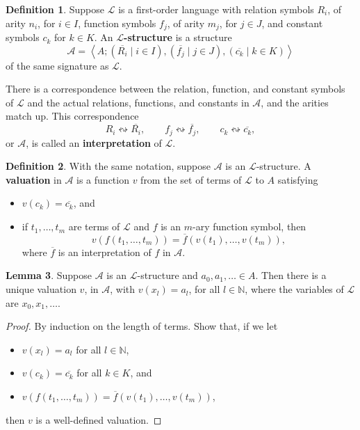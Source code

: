 \documentclass{article}
\newcommand{\N}{\mathbb{N}}
\newcommand{\A}{\mathcal{A}}
\renewcommand{\L}{\mathcal{L}}
\newcommand{\rb}[1]{\left( #1 \right)}
\newcommand{\ab}[1]{\left\langle #1 \right\rangle}
\theoremstyle{definition}\newtheorem{definition}{Definition}[subsection]
\theoremstyle{definition}\newtheorem{remark1}[definition]{Remark}
\theoremstyle{definition}\newtheorem{example1}[definition]{Example}
\theoremstyle{definition}\newtheorem*{remark2}{Remark}
\theoremstyle{definition}\newtheorem*{example2}{Example}
\theoremstyle{definition}\newtheorem*{note}{Note}
\theoremstyle{definition}\newtheorem*{notation}{Notation}
\newtheorem{lemma}[definition]{Lemma}
\begin{document}
\begin{definition}
Suppose $ \L $ is a first-order language with relation symbols $ R_i $, of arity $ n_i $, for $ i \in I $, function symbols $ f_j $, of arity $ m_j $, for $ j \in J $, and constant symbols $ c_k $ for $ k \in K $. An \textbf{$ \L $-structure} is a structure
$$ \A = \ab{A; \rb{\overline{R_i} \mid i \in I}, \rb{\overline{f_j} \mid j \in J}, \rb{\overline{c_k} \mid k \in K}} $$
of the same signature as $ \L $.
\end{definition}

There is a correspondence between the relation, function, and constant symbols of $ \L $ and the actual relations, functions, and constants in $ \A $, and the arities match up. This correspondence
$$ R_i \leftrightsquigarrow \overline{R_i}, \qquad f_j \leftrightsquigarrow \overline{f_j}, \qquad c_k \leftrightsquigarrow \overline{c_k}, $$
or $ \A $, is called an \textbf{interpretation} of $ \L $.

\begin{definition}
With the same notation, suppose $ \A $ is an $ \L $-structure. A \textbf{valuation} in $ \A $ is a function $ v $ from the set of terms of $ \L $ to $ A $ satisfying
\begin{itemize}
\item $ v\rb{c_k} = \overline{c_k} $, and
\item if $ t_1, \dots, t_m $ are terms of $ \L $ and $ f $ is an $ m $-ary function symbol, then
$$ v\rb{f\rb{t_1, \dots, t_m}} = \overline{f}\rb{v\rb{t_1}, \dots, v\rb{t_m}}, $$
where $ \overline{f} $ is an interpretation of $ f $ in $ \A $.
\end{itemize}
\end{definition}

\begin{lemma}
Suppose $ \A $ is an $ \L $-structure and $ a_0, a_1, \dots \in A $. Then there is a unique valuation $ v $, in $ \A $, with $ v\rb{x_l} = a_l $, for all $ l \in \N $, where the variables of $ \L $ are $ x_0, x_1, \dots $.
\end{lemma}

\begin{proof}
By induction on the length of terms. Show that, if we let
\begin{itemize}
\item $ v\rb{x_l} = a_l $ for all $ l \in \N $,
\item $ v\rb{c_k} = \overline{c_k} $ for all $ k \in K $, and
\item $ v\rb{f\rb{t_1, \dots, t_m}} = \overline{f}\rb{v\rb{t_1}, \dots, v\rb{t_m}} $,
\end{itemize}
then $ v $ is a well-defined valuation.
\end{proof}
\end{document}
